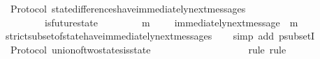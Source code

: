 \begin{isabellebody}
\isanewline
%
\endisadelimproof
\isanewline
{}\isamarkupfalse%
\ {\isacharparenleft}\ Protocol{\isacharparenright}\ state{\isacharunderscore}differences{\isacharunderscore}have{\isacharunderscore}immediately{\isacharunderscore}next{\isacharunderscore}messages{\isacharcolon}\ \isanewline
\ \ {\isachardoublequoteopen}{\isasymforall}\ {\isasymsigma}\ {\isasymin}\ {\isasymSigma}{\isachardot}\ {\isasymforall}\ {\isasymsigma}{\isacharprime}{\isasymin}\ {\isasymSigma}{\isachardot}\ is{\isacharunderscore}future{\isacharunderscore}state\ {\isacharparenleft}{\isasymsigma}{\isacharcomma}\ {\isasymsigma}{\isacharprime}{\isacharparenright}\ {\isasymand}\ {\isasymsigma}\ {\isasymnoteq}\ {\isasymsigma}{\isacharprime}\ {\isasymlongrightarrow}\ {\isacharparenleft}{\isasymexists}\ m\ {\isasymin}\ {\isasymsigma}{\isacharprime}\ {\isacharminus}\ {\isasymsigma}{\isachardot}\ immediately{\isacharunderscore}next{\isacharunderscore}message\ {\isacharparenleft}{\isasymsigma}{\isacharcomma}\ m{\isacharparenright}{\isacharparenright}{\isachardoublequoteclose}\isanewline
%
\isadelimproof
\ \ %
\endisadelimproof
%
\isatagproof
{}\isamarkupfalse%
\ strict{\isacharunderscore}subset{\isacharunderscore}of{\isacharunderscore}state{\isacharunderscore}have{\isacharunderscore}immediately{\isacharunderscore}next{\isacharunderscore}messages\isanewline
\ \ \isamarkupfalse%
\ {\isacharparenleft}simp\ add{\isacharcolon}\ psubsetI{\isacharparenright}%
\endisatagproof
{\isafoldproof}%
%
\isadelimproof
\isanewline
%
\endisadelimproof
\isanewline
\isanewline
\isanewline
\isanewline
\isanewline
{}\isamarkupfalse%
\ {\isacharparenleft}\ Protocol{\isacharparenright}\ union{\isacharunderscore}of{\isacharunderscore}two{\isacharunderscore}states{\isacharunderscore}is{\isacharunderscore}state\ {\isacharcolon}\isanewline
\ \ {\isachardoublequoteopen}{\isasymforall}\ {\isasymsigma}{}\ {\isasymin}\ {\isasymSigma}{\isachardot}\ {\isasymforall}\ {\isasymsigma}{}\ {\isasymin}\ {\isasymSigma}{\isachardot}\ {\isacharparenleft}{\isasymsigma}{}\ {\isasymunion}\ {\isasymsigma}{}{\isacharparenright}\ {\isasymin}\ {\isasymSigma}{\isachardoublequoteclose}\isanewline
%
\isadelimproof
\ \ %
\endisadelimproof
%
\isatagproof
{}\isamarkupfalse%
\ {\isacharparenleft}rule{\isacharcomma}\ rule{\isacharparenright}\isanewline
{}\isamarkupfalse%
\ {\isacharminus}\ \isanewline
\ \ \isamarkupfalse%
\ {\isasymsigma}{}\ {\isasymsigma}{}\isanewline

\end{isabellebody}
